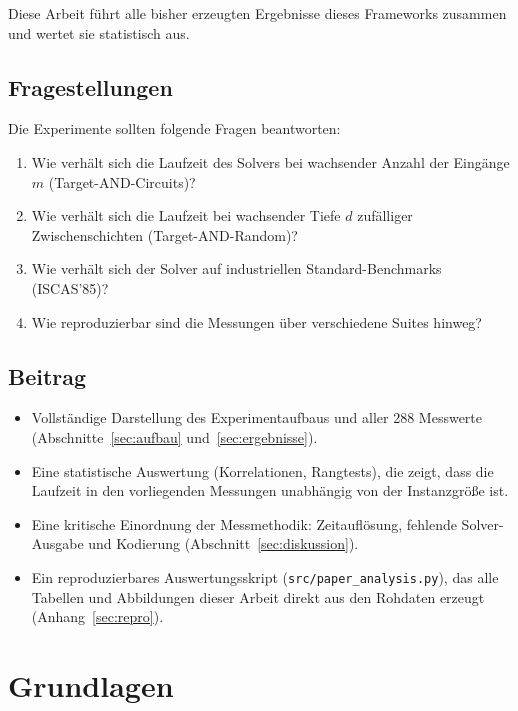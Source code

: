 \documentclass[a4paper,12pt]{article}
\theoremstyle{definition}
\begin{document}
Diese Arbeit führt alle bisher erzeugten Ergebnisse dieses Frameworks zusammen und wertet sie statistisch aus.

\subsection{Fragestellungen}

Die Experimente sollten folgende Fragen beantworten:
\begin{enumerate}[label=\textbf{F\arabic*}]
	\item Wie verhält sich die Laufzeit des Solvers bei wachsender Anzahl der Eingänge $m$ (Target-AND-Circuits)?
	\item Wie verhält sich die Laufzeit bei wachsender Tiefe $d$ zufälliger Zwischenschichten (Target-AND-Random)?
	\item Wie verhält sich der Solver auf industriellen Standard-Benchmarks (ISCAS'85)?
	\item Wie reproduzierbar sind die Messungen über verschiedene Suites hinweg?
\end{enumerate}

\subsection{Beitrag}

\begin{itemize}
	\item Vollständige Darstellung des Experimentaufbaus und aller 288 Messwerte (Abschnitte~\ref{sec:aufbau} und~\ref{sec:ergebnisse}).
	\item Eine statistische Auswertung (Korrelationen, Rangtests), die zeigt, dass die Laufzeit in den vorliegenden Messungen unabhängig von der Instanzgröße ist.
	\item Eine kritische Einordnung der Messmethodik: Zeitauflösung, fehlende Solver-Ausgabe und Kodierung (Abschnitt~\ref{sec:diskussion}).
	\item Ein reproduzierbares Auswertungsskript (\texttt{src/paper\_analysis.py}), das alle Tabellen und Abbildungen dieser Arbeit direkt aus den Rohdaten erzeugt (Anhang~\ref{sec:repro}).
\end{itemize}

\section{Grundlagen}
\end{document}
